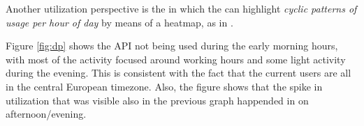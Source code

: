 

Another utilization perspective is the  in which  the \tool can highlight {\em cyclic patterns of usage per hour of day} by means of a heatmap, as in . 




Figure \ref{fig:dp} shows the API not being used during the early morning hours, with most of the activity focused around working hours and some light activity during the evening. This is consistent with the fact that the current users are all in the central European timezone. Also, the figure shows that the spike in utilization that was visible also in the previous graph happended in on afternoon/evening.






